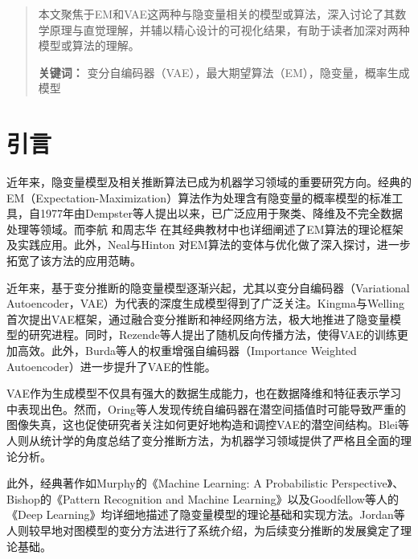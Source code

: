 \documentclass[12pt,a4paper]{article}
\begin{document}



\newcommand{\sectionline}{%
    \noindent\makebox[\linewidth]{\rule{0.8\paperwidth}{0.4pt}}
}

\newpage
\begin{abstract}
本文聚焦于EM和VAE这两种与隐变量相关的模型或算法，深入讨论了其数学原理与直觉理解，并辅以精心设计的可视化结果，有助于读者加深对两种模型或算法的理解。


\textbf{关键词：} 变分自编码器（VAE），最大期望算法（EM），隐变量，概率生成模型
\end{abstract}

\sectionline

\newpage
\tableofcontents

\newpage
\section{引言}
近年来，隐变量模型及相关推断算法已成为机器学习领域的重要研究方向。经典的EM（Expectation-Maximization）算法作为处理含有隐变量的概率模型的标准工具，自1977年由Dempster等人提出以来\cite{Dempster1977}，已广泛应用于聚类、降维及不完全数据处理等领域\cite{Do2008}。而李航\cite{LiHang2020} 和周志华\cite{ZhouZhihua2016} 在其经典教材中也详细阐述了EM算法的理论框架及实践应用。此外，Neal与Hinton\cite{Neal1998} 对EM算法的变体与优化做了深入探讨，进一步拓宽了该方法的应用范畴。

近年来，基于变分推断的隐变量模型逐渐兴起，尤其以变分自编码器（Variational Autoencoder，VAE）为代表的深度生成模型得到了广泛关注。Kingma与Welling\cite{Kingma2014,Kingma2019IntroVAE}首次提出VAE框架，通过融合变分推断和神经网络方法，极大地推进了隐变量模型的研究进程。同时，Rezende等人\cite{Rezende2014}提出了随机反向传播方法，使得VAE的训练更加高效。此外，Burda等人\cite{Burda2016}的权重增强自编码器（Importance Weighted Autoencoder）进一步提升了VAE的性能。

VAE作为生成模型不仅具有强大的数据生成能力，也在数据降维和特征表示学习中表现出色\cite{Hinton2006}。然而，Oring等人\cite{Oring2021}发现传统自编码器在潜空间插值时可能导致严重的图像失真，这也促使研究者关注如何更好地构造和调控VAE的潜空间结构\cite{Doersch2016,Kingma2015,VAEGAN2016}。Blei等人\cite{Blei2017}则从统计学的角度总结了变分推断方法，为机器学习领域提供了严格且全面的理论分析。

此外，经典著作如Murphy的《Machine Learning: A Probabilistic Perspective》\cite{Murphy2012}、Bishop的《Pattern Recognition and Machine Learning》\cite{Bishop2006}以及Goodfellow等人的《Deep Learning》\cite{Goodfellow2016}均详细地描述了隐变量模型的理论基础和实现方法。Jordan等人\cite{Jordan1999}则较早地对图模型的变分方法进行了系统介绍，为后续变分推断的发展奠定了理论基础。
\end{document}

